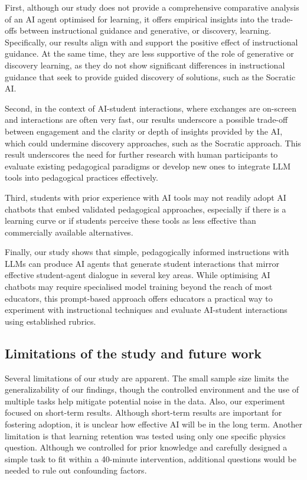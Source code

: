 \documentclass[
  12pt,
]{article}
\begin{document}
First, although our study does not provide a comprehensive comparative analysis of an AI agent optimised for learning, it offers empirical insights into the trade-offs between instructional guidance and generative, or discovery, learning. Specifically, our results align with and support the positive effect of instructional guidance. At the same time, they are less supportive of the role of generative or discovery learning, as they do not show significant differences in instructional guidance that seek to provide guided discovery of solutions, such as the Socratic AI.

Second, in the context of AI-student interactions, where exchanges are on-screen and interactions are often very fast, our results underscore a possible trade-off between engagement and the clarity or depth of insights provided by the AI, which could undermine discovery approaches, such as the Socratic approach. This result underscores the need for further research with human participants to evaluate existing pedagogical paradigms or develop new ones to integrate LLM tools into pedagogical practices effectively.

Third, students with prior experience with AI tools may not readily adopt AI chatbots that embed validated pedagogical approaches, especially if there is a learning curve or if students perceive these tools as less effective than commercially available alternatives.

Finally, our study shows that simple, pedagogically informed instructions with LLMs can produce AI agents that generate student interactions that mirror effective student-agent dialogue in several key areas. While optimising AI chatbots may require specialised model training beyond the reach of most educators, this prompt-based approach offers educators a practical way to experiment with instructional techniques and evaluate AI-student interactions using established rubrics.

\subsection{Limitations of the study and future work}\label{limitations-of-the-study-and-future-work}

Several limitations of our study are apparent. The small sample size limits the generalizability of our findings, though the controlled environment and the use of multiple tasks help mitigate potential noise in the data. Also, our experiment focused on short-term results. Although short-term results are important for fostering adoption, it is unclear how effective AI will be in the long term. Another limitation is that learning retention was tested using only one specific physics question. Although we controlled for prior knowledge and carefully designed a simple task to fit within a 40-minute intervention, additional questions would be needed to rule out confounding factors.
\end{document}
